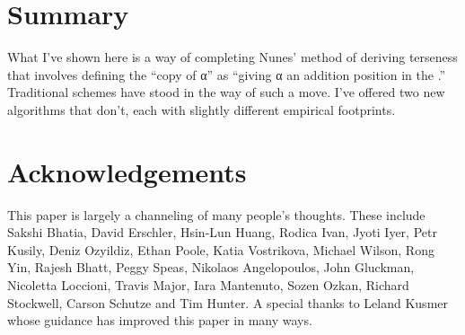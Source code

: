 \documentclass[output=paper]{langsci/langscibook}
\begin{document}

\section{Summary} %
\label{sec:30.summary}

What I've shown here is a way of completing Nunes' method of deriving terseness
that involves defining the ``copy of α'' as ``giving α an addition position in
the .'' Traditional  schemes have stood in the
way of such a move. I've offered two new  algorithms that
don't, each with slightly different empirical footprints.



\printchapterglossary{}

\section*{Acknowledgements}

This paper is largely a channeling of many people's thoughts. These include
Sakshi Bhatia, David Erschler, Hsin-Lun Huang, Rodica Ivan, Jyoti Iyer, Petr
Kusily, Deniz Ozyildiz, Ethan Poole, Katia Vostrikova, Michael Wilson, Rong
Yin, Rajesh Bhatt, Peggy Speas, Nikolaos Angelopoulos, John Gluckman, Nicoletta
Loccioni, Travis Major, Iara Mantenuto, Sozen Ozkan, Richard Stockwell, Carson
Schutze and Tim Hunter. A special thanks to Leland Kusmer whose guidance has
improved this paper in many ways.

{\sloppy\printbibliography[heading=subbibliography,notkeyword=this]}
\end{document}
